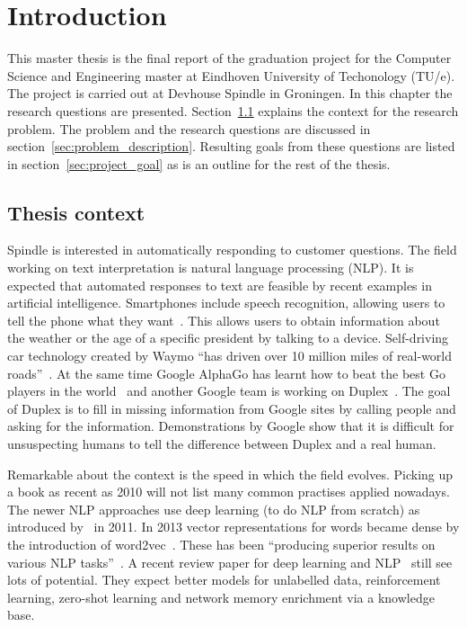 \chapter{Introduction}
\label{ch:introduction}

\setcounter{page}{0}
This master thesis is the final report of the graduation project for the Computer Science and Engineering master at Eindhoven University of Techonology (TU/e).
The project is carried out at Devhouse Spindle in Groningen.
In this chapter the research questions are presented.
Section~\ref{sec:thesis_context} explains the context for the research problem.
The problem and the research questions are discussed in section~\ref{sec:problem_description}.
Resulting goals from these questions are listed in section~\ref{sec:project_goal} as is an outline for the rest of the thesis.

\section{Thesis context}
\label{sec:thesis_context}
Spindle is interested in automatically responding to customer questions.
The field working on text interpretation is natural language processing (NLP).
It is expected that automated responses to text are feasible by recent examples in artificial intelligence.
Smartphones include speech recognition, allowing users to tell the phone what they want~\citep{lopez2017alexa}.
This allows users to obtain information about the weather or the age of a specific president by talking to a device.
Self-driving car technology created by Waymo ``has driven over 10 million miles of real-world roads''~\citep{waymo2018}.
At the same time Google AlphaGo has learnt how to beat the best Go players in the world~\citep{gibney2016google} and another Google team is working on Duplex~\citep{leviathan2018google}.
The goal of Duplex is to fill in missing information from Google sites by calling people and asking for the information.
Demonstrations by Google show that it is difficult for unsuspecting humans to tell the difference between Duplex and a real human.

Remarkable about the context is the speed in which the field evolves.
Picking up a book as recent as 2010 will not list many common practises applied nowadays.
The newer NLP approaches use deep learning (to do NLP from scratch) as introduced by~\citet{collobert2011natural} in 2011.
In 2013 vector representations for words became dense by the introduction of word2vec~\citep{mikolov2013distributed}.
These has been ``producing superior results on various NLP tasks''~\citep{young2018recent}.
A recent review paper for deep learning and NLP~\citep{young2018recent} still see lots of potential.
They expect better models for unlabelled data, reinforcement learning, zero-shot learning and network memory enrichment via a knowledge base.

